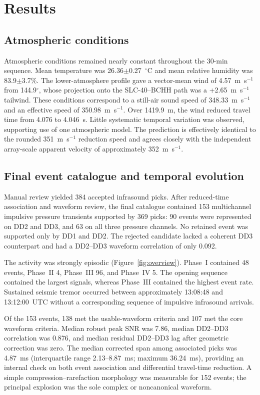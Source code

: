 \documentclass[]{seismica}
\begin{document}
\section{Results}
\label{sec:results}

\subsection{Atmospheric conditions}
\label{sec:results_atmosphere}

Atmospheric conditions remained nearly constant throughout the 30-min
sequence. Mean temperature was 26.36$\pm$0.27~$^\circ$C and mean relative
humidity was 83.9$\pm$3.7\%. The lower-atmosphere profile gave a vector-mean
wind of 4.57~m~s$^{-1}$ from 144.9$^\circ$, whose projection onto the
SLC-40--BCHH path was a +2.65~m~s$^{-1}$ tailwind. These conditions correspond
to a still-air sound speed of 348.33~m~s$^{-1}$ and an effective speed of
350.98~m~s$^{-1}$. Over 1419.9~m, the wind reduced travel time from 4.076 to
4.046~s. Little systematic temporal variation was observed, supporting use of
one atmospheric model. The prediction is effectively identical to the rounded
351~m~s$^{-1}$ reduction speed and agrees closely with the independent
array-scale apparent velocity of approximately 352~m~s$^{-1}$.


\subsection{Final event catalogue and temporal evolution}
\label{sec:results_catalogue}

Manual review yielded 384 accepted infrasound picks. After reduced-time
association and waveform review, the final catalogue contained 153
multichannel impulsive pressure transients
supported by 369 picks: 90 events were represented on DD2 and DD3, and 63 on
all three pressure channels. No retained event was supported only by DD1 and
DD2. The rejected candidate lacked a coherent DD3 counterpart and had a
DD2--DD3 waveform correlation of only 0.092.

The activity was strongly episodic (Figure~\ref{fig:overview}). Phase~I
contained 48 events, Phase~II 4, Phase~III 96, and Phase~IV 5. The opening
sequence contained the largest signals, whereas Phase~III contained the
highest event rate. Sustained seismic tremor occurred between approximately
13:08:48 and 13:12:00~UTC without a corresponding sequence of impulsive
infrasound arrivals.

Of the 153 events, 138 met the usable-waveform criteria and 107 met the core
waveform criteria. Median robust peak SNR was 7.86, median DD2--DD3 correlation
was 0.876, and median residual DD2--DD3 lag after geometric correction was
zero. The median corrected span among associated picks was 4.87~ms
(interquartile range 2.13--8.87~ms; maximum 36.24~ms), providing an internal
check on both event association and differential travel-time reduction. A
simple compression--rarefaction morphology was measurable for 152 events; the
principal explosion was the sole complex or noncanonical waveform.
\end{document}
